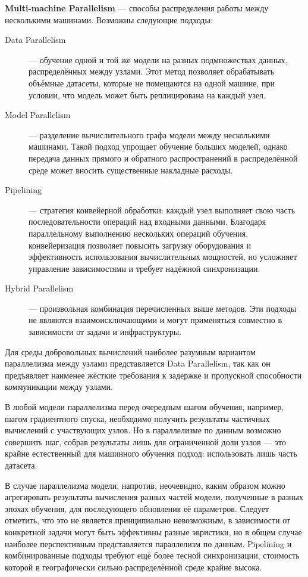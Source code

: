 \documentclass[a4paper,12pt]{extarticle}
\begin{document}
    \textbf{Multi-machine Parallelism} — способы распределения работы между несколькими машинами.
    Возможны следующие подходы:
    \begin{description}
        \item[Data Parallelism] — обучение одной и той же модели на разных подмножествах данных, распределённых между узлами.
        Этот метод позволяет обрабатывать объёмные датасеты, которые не помещаются на одной машине, при условии, что модель может быть реплицирована на каждый узел.
        \item[Model Parallelism] — разделение вычислительного графа модели между несколькими машинами.
        Такой подход упрощает обучение больших моделей, однако передача данных прямого и обратного распространений в распределённой среде может вносить существенные накладные расходы.
        \item[Pipelining] — стратегия конвейерной обработки: каждый узел выполняет свою часть последовательности операций над входными данными.
        Благодаря параллельному выполнению нескольких операций обучения, конвейеризация позволяет повысить загрузку оборудования и эффективность использования вычислительных мощностей, но усложняет управление зависимостями и требует надёжной синхронизации.
        \item[Hybrid Parallelism] — произвольная комбинация перечисленных выше методов.
        Эти подходы не являются взаимоисключающими и могут применяться совместно в зависимости от задачи и инфраструктуры.
    \end{description}

    Для среды добровольных вычислений наиболее разумным вариантом параллелизма между узлами представляется Data Parallelism, так как он предъявляет наименее жёсткие требования к задержке и пропускной способности коммуникации между узлами.

    В любой модели параллелизма перед очередным шагом обучения, например, шагом градиентного спуска, необходимо получить результаты частичных вычислений с участвующих узлов.
    Но в параллелизме по данным возможно совершить шаг, собрав результаты лишь для ограниченной доли узлов — это крайне естественный для машинного обучения подход: использовать лишь часть датасета.

    В случае параллелизма модели, напротив, неочевидно, каким образом можно агрегировать результаты вычисления разных частей модели, полученные в разных эпохах обучения, для последующего обновления её параметров.
    Следует отметить, что это не является принципиально невозможным, в зависимости от конкретной задачи могут быть эффективны разные эвристики, но в общем случае наиболее перспективным представляется параллелизм по данным.
    Pipelining и комбинированные подходы требуют ещё более тесной синхронизации, стоимость которой в географически сильно распределённой среде крайне высока.
\end{document}
